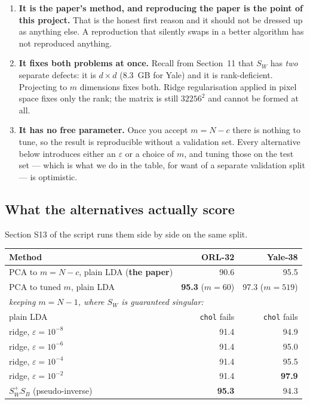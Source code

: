 \documentclass[11pt]{article}
\theoremstyle{definition}
\theoremstyle{remark}
\newcommand{\Sw}{S_W}
\newcommand{\Sb}{S_B}
\begin{document}
\begin{enumerate}[leftmargin=*,label=\arabic*.]
\item \textbf{It is the paper's method, and reproducing the paper is the point of
  this project.} That is the honest first reason and it should not be dressed up
  as anything else. A reproduction that silently swaps in a better algorithm has
  not reproduced anything.
\item \textbf{It fixes both problems at once.} Recall from Section~11 that $\Sw$
  has \emph{two} separate defects: it is $d\times d$ (8.3~GB for Yale) and it is
  rank-deficient. Projecting to $m$ dimensions fixes both. Ridge regularisation
  applied in pixel space fixes only the rank; the matrix is still $32256^2$ and
  cannot be formed at all.
\item \textbf{It has no free parameter.} Once you accept $m=N-c$ there is nothing
  to tune, so the result is reproducible without a validation set. Every
  alternative below introduces either an $\varepsilon$ or a choice of $m$, and
  tuning those on the test set --- which is what we do in the table, for want of a
  separate validation split --- is optimistic.
\end{enumerate}

\subsection{What the alternatives actually score}

Section S13 of the script runs them side by side on the same split.

\begin{center}
\begin{tabular}{lrr}
\toprule
Method & ORL-32 & Yale-38 \\
\midrule
PCA to $m=N-c$, plain LDA \quad(\textbf{the paper})   & 90.6 & 95.5 \\
PCA to tuned $m$, plain LDA                           & \textbf{95.3} ($m{=}60$) & 97.3 ($m{=}519$) \\
\midrule
\multicolumn{3}{l}{\emph{keeping $m=N-1$, where $\Sw$ is guaranteed singular:}}\\
\quad plain LDA                                       & \texttt{chol} fails & \texttt{chol} fails \\
\quad ridge, $\varepsilon=10^{-8}$                    & 91.4 & 94.9 \\
\quad ridge, $\varepsilon=10^{-6}$                    & 91.4 & 95.0 \\
\quad ridge, $\varepsilon=10^{-4}$                    & 91.4 & 95.5 \\
\quad ridge, $\varepsilon=10^{-2}$                    & 91.4 & \textbf{97.9} \\
\quad $\Sw^{+}\Sb$ (pseudo-inverse)                   & \textbf{95.3} & 94.3 \\
\bottomrule
\end{tabular}
\end{center}
\end{document}
